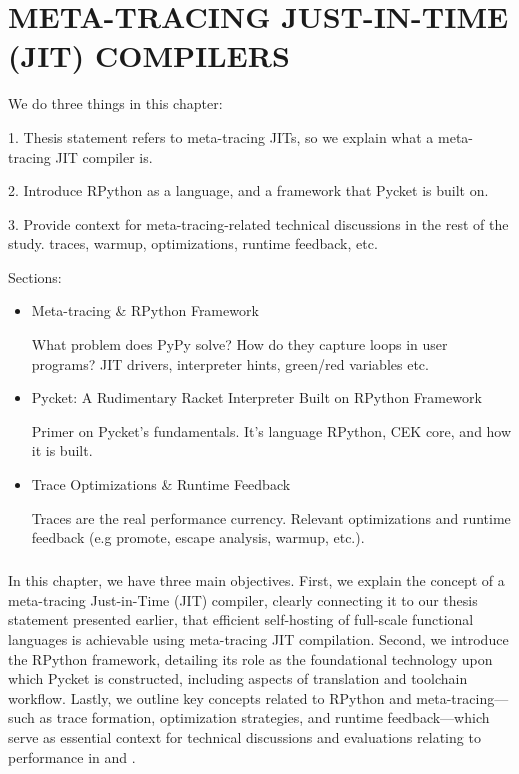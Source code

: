 \chapter[\texorpdfstring{META-TRACING JUST-IN-TIME (JIT) COMPILERS}
                          {RPython \& Meta-tracing}]{META-TRACING JUST-IN-TIME (JIT) COMPILERS}
    \label{chapter:rpython}

    \begin{chaptersynopsis}

        We do three things in this chapter:

        1. Thesis statement refers to meta-tracing JITs, so we explain what a meta-tracing JIT compiler is.

        2. Introduce RPython as a language, and a framework that Pycket is built on.

        3. Provide context for meta-tracing-related technical discussions in the rest of the study. traces, warmup, optimizations, runtime feedback, etc.

        \vspace{2em}

        Sections:
		\begin{itemize}
			\item Meta-tracing \& RPython Framework

                What problem does PyPy solve? How do they capture loops in user programs? JIT drivers, interpreter hints, green/red variables etc.
			\item Pycket: A Rudimentary Racket Interpreter Built on RPython Framework

                Primer on Pycket's fundamentals. It's language RPython, CEK core, and how it is built.
			\item Trace Optimizations \& Runtime Feedback

                Traces are the real performance currency. Relevant optimizations and runtime feedback (e.g promote, escape analysis, warmup, etc.).
		\end{itemize}
    \end{chaptersynopsis}

    \paragraph{}%
        In this chapter, we have three main objectives. First, we explain the concept of a meta-tracing Just-in-Time (JIT) compiler, clearly connecting it to our thesis statement presented earlier, that efficient self-hosting of full-scale functional languages is achievable using meta-tracing JIT compilation. Second, we introduce the RPython framework, detailing its role as the foundational technology upon which Pycket is constructed, including aspects of translation and toolchain workflow. Lastly, we outline key concepts related to RPython and meta-tracing—such as trace formation, optimization strategies, and runtime feedback—which serve as essential context for technical discussions and evaluations relating to performance in  and .

